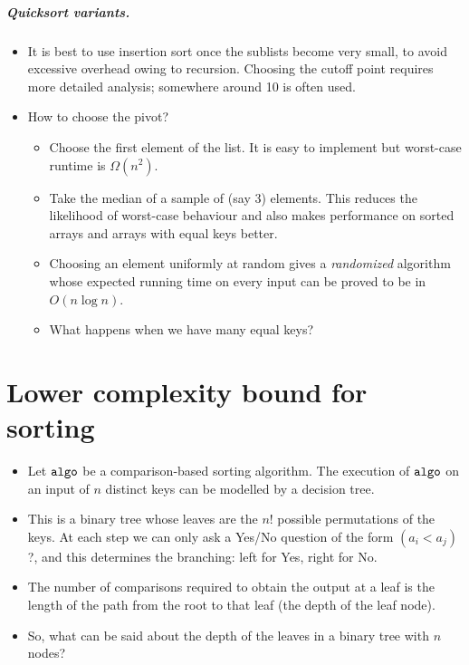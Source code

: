\paragraph{Quicksort variants.}
\begin{itemize}
\item It is best to use insertion sort once the sublists become very small, to 
avoid excessive overhead owing to recursion. Choosing the cutoff point requires 
more detailed analysis; somewhere around 10 is often used.
\item How to choose the pivot? 
\begin{itemize}
\item Choose the first element of the list. It is easy to implement but
worst-case runtime is $\Omega(n^2)$.
\item Take the median of a sample of (say 3) elements. This reduces the 
likelihood of worst-case behaviour and also makes performance on sorted arrays 
and arrays with equal keys better. 
\item Choosing an element uniformly at random gives a \emph{randomized} 
algorithm whose expected running time on every input can be proved to be in 
$O(n \log n)$. 
\item What happens when we have many equal keys?
\end{itemize}
\end{itemize}



\chapter{Lower complexity bound for sorting} %
\label{sec:lowerbound}

\begin{itemize}
\item Let $\algo$ be a comparison-based sorting algorithm. The execution
of $\algo$ on an input of $n$ distinct keys can be modelled by a
{decision tree}. 
\item This is a binary tree whose leaves are the
$n!$ possible permutations of the keys. At each step we can only ask a Yes/No 
question of the form $(a_i < a_j)$?, and this determines the branching: left for
 Yes, right for No.
\item The number of comparisons required to obtain the output at a leaf is the 
length of the path from the root to that leaf (the {depth} of the leaf 
node).
\item So, what can be said about the depth of the leaves in a binary tree with 
$n$ nodes?
\end{itemize}


